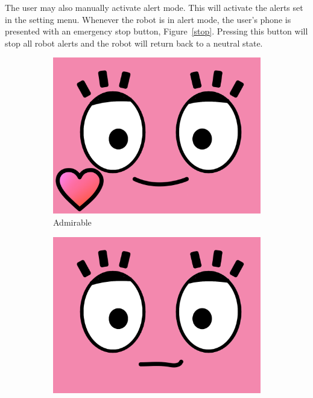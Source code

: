 \documentclass[12pt]{article}
\begin{document}
The user may also manually activate alert mode. This will activate the alerts set in the setting menu. Whenever the robot is in alert mode, the user's phone is presented with an emergency stop button, Figure~\ref{stop}. Pressing this button will stop all robot alerts and the robot will return back to a neutral state.

\begin{figure}[!htbp]
    \centering
    \begin{subfigure}[b]{0.23\textwidth}
    \centering
    \includegraphics[width=\textwidth]{4.png}
    \caption{Admirable}
    \label{like}
    \end{subfigure}
    \begin{subfigure}[b]{0.23\textwidth}
    \centering
    \includegraphics[width=\textwidth]{5.png}

\end{subfigure}
\end{figure}
\end{document}
